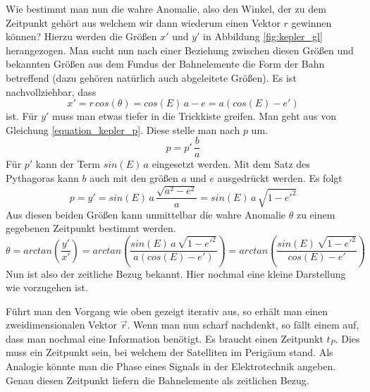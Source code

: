 \newpar
Wie bestimmt man nun die wahre Anomalie, also den Winkel, der zu dem Zeitpunkt gehört aus welchem wir dann wiederum einen Vektor \ensuremath{r} gewinnen können? Hierzu werden die Größen \ensuremath{x'} und \ensuremath{y'} in Abbildung \ref{fig:kepler_gl} herangezogen. Man sucht nun nach einer Beziehung zwischen diesen Größen und bekannten Größen aus dem Fundus der Bahnelemente die Form der Bahn betreffend (dazu gehören natürlich auch abgeleitete Größen). 
Es ist nachvollziehbar, dass 
\begin{equation}
	x'=r\,cos(\theta)=cos(E)\,a-e=a\left(cos(E)-e'\right)
\end{equation}
ist. Für \ensuremath{y'} muss man etwas tiefer in die Trickkiste greifen. Man geht aus von Gleichung \ref{equation_kepler_p}. Diese stelle man nach \ensuremath{p} um.
\begin{equation}
	p=p'\,\frac{b}{a}
\end{equation} 
Für \ensuremath{p'} kann der Term \ensuremath{sin(E)\,a} eingesetzt werden. Mit dem Satz des Pythagoras kann \ensuremath{b} auch mit den größen \ensuremath{a} und \ensuremath{e} ausgedrückt werden. Es folgt  
\begin{equation}
	p=y'=sin(E)\,a\,\frac{\sqrt{a^2-e^2}}{a}=sin(E)\,a\,\sqrt{1-e'^2}
\end{equation} 
Aus diesen beiden Größen kann unmittelbar die wahre Anomalie \ensuremath{\theta} zu einem gegebenen Zeitpunkt bestimmt werden.
\begin{equation}
	\theta=arctan\left(\frac{y'}{x'}\right)=arctan\left(\frac{sin(E)\,a\,\sqrt{1-e'^2}}{a\left(cos(E)-e'\right)}\right)=arctan\left(\frac{sin(E)\,\sqrt{1-e'^2}}{cos(E)-e'}\right)
\end{equation}
\newpar
Nun ist also der zeitliche Bezug bekannt. Hier nochmal eine kleine Darstellung wie vorzugehen ist.
\begin{center}
\end{center}
Führt man den Vorgang wie oben gezeigt iterativ aus, so erhält man einen zweidimensionalen Vektor \ensuremath{\vec{r}}. Wenn man nun scharf nachdenkt, so fällt einem auf, dass man nochmal eine Information benötigt. Es braucht einen Zeitpunkt \ensuremath{t_P}. Dies muss ein Zeitpunkt sein, bei welchem der Satelliten im Perigäum stand. Als Analogie könnte man die Phase eines Signals in der Elektrotechnik angeben. Genau diesen Zeitpunkt liefern die Bahnelemente als zeitlichen Bezug.
